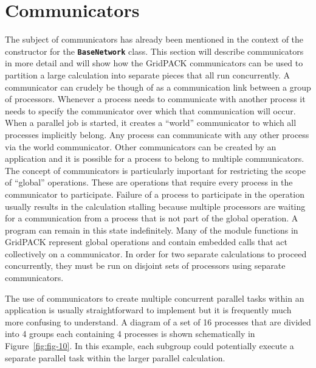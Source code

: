 \section{Communicators}

The subject of communicators has already been mentioned in the context of the constructor for the \texttt{\textbf{BaseNetwork}} class. This section will describe communicators in more detail and will show how the GridPACK communicators can be used to partition a large calculation into separate pieces that all run concurrently. A communicator can crudely be though of as a communication link between a group of processors. Whenever a process needs to communicate with another process it needs to specify the communicator over which that communication will occur. When a parallel job is started, it creates a ``world'' communicator to which all processes implicitly belong. Any process can communicate with any other process via the world communicator. Other communicators can be created by an application and it is possible for a process to belong to multiple communicators. The concept of communicators is particularly important for restricting the scope of ``global'' operations. These are operations that require every process in the communicator to participate. Failure of a process to participate in the operation usually results in the calculation stalling because multiple processors are waiting for a communication from a process that is not part of the global operation. A program can remain in this state indefinitely. Many of the module functions in GridPACK represent global operations and contain embedded calls that act collectively on a communicator. In order for two separate calculations to proceed concurrently, they must be run on disjoint sets of processors using separate communicators.

The use of communicators to create multiple concurrent parallel tasks within an application is usually straightforward to implement but it is frequently much more confusing to understand. A diagram of a set of 16 processes that are divided into 4 groups each containing 4 processes is shown schematically in Figure~\ref{fig:fig-10}. In this example, each subgroup could potentially execute a separate parallel task within the larger parallel calculation.


